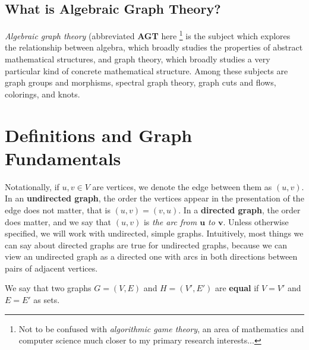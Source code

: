 \classheader{}


\subsection*{What is Algebraic Graph Theory?}

\textit{Algebraic graph theory} (abbreviated \textbf{AGT} here \footnote{Not to be confused with \textit{algorithmic game theory}, an area of mathematics and computer science much closer to my primary research interests...} is the subject which explores the relationship between algebra, which broadly studies the properties of abstract mathematical structures, and graph theory, which broadly studies a very particular kind of concrete mathematical structure.  Among these subjects are graph groups and morphisms, spectral graph theory, graph cuts and flows, colorings, and knots.




\section*{Definitions and Graph Fundamentals}



Notationally, if $u,v\in V$ are vertices, we denote the edge between them as $(u,v)$.  In an \textbf{undirected graph}, the order the vertices appear in the presentation of the edge does not matter, that is $(u,v)=(v,u)$.  In a \textbf{directed graph}, the order does matter, and we say that $(u,v)$ is \textit{the arc from $\boldsymbol{u}$ to $\boldsymbol{v}$}.  Unless otherwise specified, we will work with undirected, simple graphs.  Intuitively, most things we can say about directed graphs are true for undirected graphs, because we can view an undirected graph as a directed one with arcs in both directions between pairs of adjacent vertices.

We say that two graphs $G=(V,E)$ and $H=(V',E')$ are \textbf{equal} if $V=V'$ and $E=E'$ as sets.


